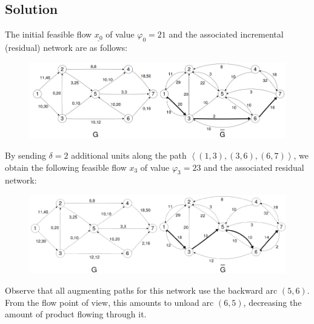 \documentclass[12pt, a4paper]{report}
\begin{document}
    \subsection*{Solution}
        The initial feasible flow $\underline{x_0}$ of value $\varphi_0 = 21$ and the associated incremental (residual) network are as follows:        
        \begin{figure}[H]
            \centering
            \includegraphics[width=1\linewidth]{images/flow.png}
        \end{figure}
        By sending $\delta = 2$ additional units along the path $\left\langle (1, 3),(3, 6),(6, 7)\right\rangle $, we obtain the following feasible flow 
        $x_3$ of value $\varphi_3 = 23$ and the associated residual network:
        \begin{figure}[H]
            \centering
            \includegraphics[width=1\linewidth]{images/flow1.png}
        \end{figure}
        Observe that all augmenting paths for this network use the backward arc $(5, 6)$. From the flow point of view, this amounts to unload arc $(6, 5)$, decreasing the amount of product flowing
        through it.
\end{document}
